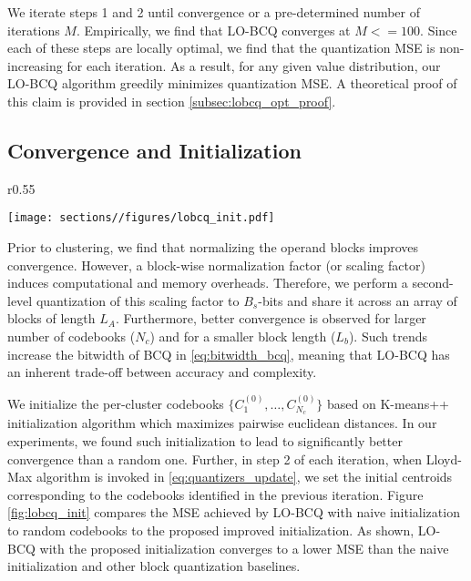 We iterate steps 1 and 2 until convergence or a pre-determined number of iterations $M$. Empirically, we find that LO-BCQ converges at $M<=100$. Since each of these steps are locally optimal, we find that the quantization MSE is non-increasing for each iteration. As a result, for any given value distribution, our LO-BCQ algorithm greedily minimizes quantization MSE. A theoretical proof of this claim is provided in section \ref{subsec:lobcq_opt_proof}. 

\subsection{Convergence and Initialization}
\label{subsec:lobcq_convergence_and_init}

\begin{wrapfigure}{r}{0.55\columnwidth}
    \begin{center}
    \texttt{[image: sections//figures/lobcq\_init.pdf]}
    \end{center}
    \caption{\small NMSE of LO-BCQ with naive initialization compared to the proposed initialization. Here LOBCQ is configured with a block array size of $64$ and $16$ codebooks.}
    \label{fig:lobcq_init}
\end{wrapfigure}
Prior to clustering, we find that normalizing the operand blocks improves convergence. However, a block-wise normalization factor (or scaling factor) induces computational and memory overheads. Therefore, we perform a second-level quantization of this scaling factor to $B_s$-bits and share it across an array of blocks of length $L_{A}$. Furthermore, better convergence is observed for larger number of codebooks ($N_c$) and for a smaller block length ($L_b$). Such trends increase the bitwidth of BCQ in \eqref{eq:bitwidth_bcq}, meaning that LO-BCQ has an inherent trade-off between accuracy and complexity. 

We initialize the per-cluster codebooks $\{C_1^{(0)}, \ldots, C_{N_c}^{(0)}\}$ based on K-means++ initialization algorithm which maximizes pairwise euclidean distances. In our experiments, we found such initialization to lead to significantly better convergence than a random one. Further, in step 2 of each iteration, when Lloyd-Max algorithm is invoked in \eqref{eq:quantizers_update}, we set the initial centroids corresponding to the codebooks identified in the previous iteration. Figure \ref{fig:lobcq_init} compares the MSE achieved by LO-BCQ with naive initialization to random codebooks to the proposed improved initialization. As shown, LO-BCQ with the proposed initialization converges to a lower MSE than the naive initialization and other block quantization baselines.

